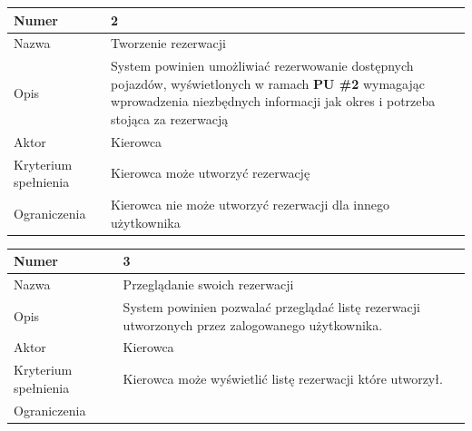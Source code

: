 \documentclass[eng,printmode,openany]{mgr}
\begin{document}
	\begin{table}[H]
		\begin{tabularx}{\textwidth}{|l|X|}
			\hline
			Numer                & 2 \\ \hline
			Nazwa                & Tworzenie rezerwacji \\ \hline
			Opis                 & System powinien umożliwiać rezerwowanie dostępnych pojazdów, wyświetlonych w ramach \textbf{PU \#2} wymagając wprowadzenia niezbędnych informacji jak okres i potrzeba stojąca za rezerwacją\\ \hline
			Aktor                & Kierowca \\ \hline
			Kryterium spełnienia & Kierowca może utworzyć rezerwację \\ \hline
			Ograniczenia         & Kierowca nie może utworzyć rezerwacji dla innego użytkownika \\ \hline
		\end{tabularx}
	\end{table}	

	\begin{table}[H]
		\begin{tabularx}{\textwidth}{|l|X|}
			\hline
			Numer                & 3  \\ \hline
			Nazwa                & Przeglądanie swoich rezerwacji \\ \hline
			Opis                 & System powinien pozwalać przeglądać listę rezerwacji utworzonych przez zalogowanego użytkownika. \\ \hline
			Aktor                & Kierowca \\ \hline
			Kryterium spełnienia & Kierowca może wyświetlić listę rezerwacji które utworzył. \\ \hline
			Ograniczenia         &  \\ \hline
		\end{tabularx}
	\end{table}
\end{document}
